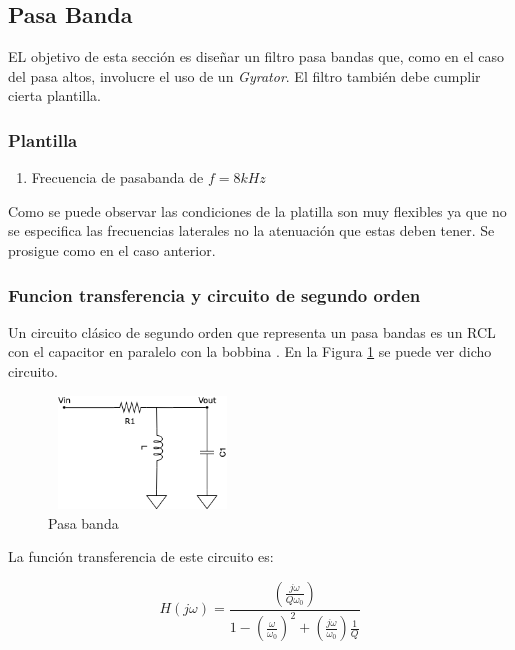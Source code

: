 \documentclass[12pt,a4paper]{article}
\begin{document}
\subsection{Pasa Banda}

EL objetivo de esta sección es diseñar un filtro pasa bandas que, como en el caso del pasa altos, involucre el uso de un \textit{Gyrator}. El filtro también debe cumplir cierta plantilla.

\subsubsection{Plantilla}

\begin{enumerate}
	\item Frecuencia de pasabanda de $f = 8kHz$	
\end{enumerate}

Como se puede observar las condiciones de la platilla son muy flexibles ya que no se especifica las frecuencias laterales no la atenuación que estas deben tener. Se prosigue como en el caso anterior. 

\subsubsection{Funcion transferencia y circuito de segundo orden}

Un circuito clásico de segundo orden que representa un pasa bandas es un RCL con el capacitor en paralelo con la bobbina . En la Figura \ref{ej2_filto_BP} se puede ver dicho circuito. 

\begin{figure}[h!]                                                       
    \centering\includegraphics[width=5cm, height=3cm]{Resources/ej2_bp.png}
    \caption{Pasa banda}
    \label{ej2_filto_BP}
    \end{figure}


La función transferencia de este circuito es:


\begin{equation} H(j\omega) = \frac{(\frac{j\omega}{Q\omega_0})}{1 - (\frac{\omega}{\omega_0})^{2} + (\frac{j\omega}{\omega_0})\frac{1}{Q}} \label{equ:trans_clasica_bp}\end{equation}  
\end{document}
